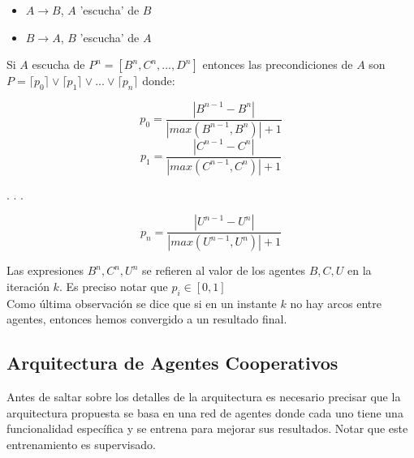 \documentclass{article}
\begin{document}
        \begin{itemize}
            \item $A\rightarrow B$, $A$ 'escucha' de $B$
            \item  $B \rightarrow A$, $B$ 'escucha' de $A$
        \end{itemize}

        Si $A$ escucha de $P^n=[B^n,C^n,...,D^n]$ entonces las precondiciones de $A$ son $P=\lceil p_0 \rceil \lor \lceil p_1 \rceil \lor...\lor \lceil p_n \rceil$ donde:
        
        \begin{equation*}
            p_0=  \frac{|B^{n-1}-B^n|}{|max(B^{n-1},B^n)|+1} 
            
        \end{equation*}
        \begin{equation*}
            p_1= \frac{|C^{n-1}-C^n|}{|max(C^{n-1},C^n)|+1} 
            
        \end{equation*}
        \begin{center}
            .
            .
            .
        \end{center}
            
        \begin{equation*}
            p_n=  \frac{|U^{n-1}-U^n|}{|max(U^{n-1},U^n)|+1} 
            
        \end{equation*}

        Las expresiones $B^n,C^n,U^n$ se refieren al valor de los agentes $B,C,U$ en la iteración $k$. Es preciso notar que $p_i \in [0,1]$ \\

        Como última observación se dice que si en un instante $k$ no hay arcos entre agentes, entonces hemos convergido a un resultado final.

    \subsection*{\large Arquitectura de Agentes Cooperativos} 

        Antes de saltar sobre los detalles de la arquitectura es necesario precisar que la arquitectura propuesta se basa en una red de agentes donde cada uno tiene una funcionalidad específica y se entrena para mejorar sus resultados. Notar que este entrenamiento es supervisado. \\
        
\end{document}
